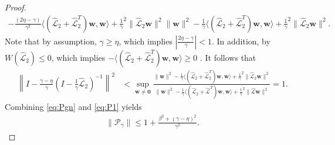 \documentclass[a4paper,10pt]{article}
\begin{document}
\begin{proof}
\begin{align*}
{	- \tfrac{(2\eta-\gamma)}{\gamma^2}\langle (\widehat{\mathcal{L}}_2 + \widehat{\mathcal{L}}_2^T)
		\mathbf{w},\mathbf{w}\rangle + \tfrac{1}{\gamma}^2\|\widehat{\mathcal{L}}_2\mathbf{w}\|^2}
	{\|\mathbf{w}\|^2 - \tfrac{1}{\gamma}\langle (\widehat{\mathcal{L}}_2 + \widehat{\mathcal{L}}_2^T)
		\mathbf{w},\mathbf{w}\rangle + \tfrac{1}{\gamma}^2\|\widehat{\mathcal{L}}_2\mathbf{w}\|^2}.
\end{align*}
%
Note that by assumption, $\gamma \geq \eta$, which implies
$|\tfrac{2\eta - \gamma}{\gamma}| < 1$. In addition, by 
$W(\widehat{\mathcal{L}}_2)\leq 0$,
which implies $-\langle (\widehat{\mathcal{L}}_2+\widehat{\mathcal{L}}_2^T)\mathbf{w},\mathbf{w}\rangle \geq 0$
\cite{gustafson1997numerical,mees1979domains}.
It follows that
%
\begin{align} \label{eq:P1}
\left\| I - \tfrac{\gamma-\eta}
	{\gamma}(I - \tfrac{1}{\gamma}\widehat{\mathcal{L}}_2)^{-1}\right\|^2
& < \sup_{\mathbf{w}\neq\mathbf{0}} \frac{\|\mathbf{w}\|^2
	- \tfrac{1}{\gamma}\langle (\widehat{\mathcal{L}}_2 + \widehat{\mathcal{L}}_2^T)
		\mathbf{w},\mathbf{w}\rangle + \tfrac{1}{\gamma}^2\|\widehat{\mathcal{L}}_2\mathbf{w}\|^2}
	{\|\mathbf{w}\|^2 - \tfrac{1}{\gamma}\langle (\widehat{\mathcal{L}}_2 + \widehat{\mathcal{L}}^T)
		\mathbf{w},\mathbf{w}\rangle + \tfrac{1}{\gamma}^2\|\widehat{\mathcal{L}}\mathbf{w}\|^2} 
= 1.
\end{align}
%
Combining \eqref{eq:Pgn} and \eqref{eq:P1} yields
%
\begin{align}\label{eq:Pgamma_gen}
\|\mathcal{P}_\gamma\| \leq 1 + \frac{\beta^2 + (\gamma-\eta)^2}{\gamma^2}.
\end{align}


\end{proof}
\end{document}
